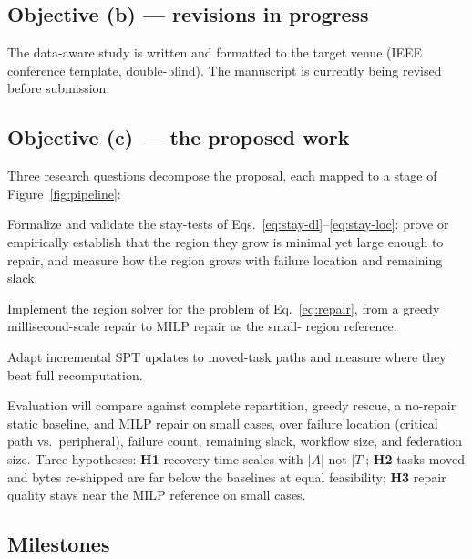 \documentclass[11pt]{article}
\begin{document}
\subsection{Objective (b) --- revisions in progress}

The data-aware study is written and formatted to the target
venue (IEEE conference template, double-blind). The manuscript
is currently being revised before submission.

\subsection{Objective (c) --- the proposed work}

Three research questions decompose the proposal, each mapped to
a stage of Figure~\ref{fig:pipeline}:

\begin{description}[leftmargin=*,style=nextline]
\item[RQ1 --- Boundary (Stage 3).] Formalize and validate the
stay-tests of Eqs.~\eqref{eq:stay-dl}--\eqref{eq:stay-loc}:
prove or empirically establish that the region they grow is
minimal yet large enough to repair, and measure how the region
grows with failure location and remaining slack.
\item[RQ2 --- Repair (Stages 4--5).] Implement the region
solver for the problem of Eq.~\eqref{eq:repair}, from a
greedy millisecond-scale repair to MILP repair as the small-
region reference.
\item[RQ3 --- Paths (Stage 6).] Adapt incremental SPT updates
to moved-task paths and measure where they beat full
recomputation.
\end{description}

Evaluation will compare against complete repartition, greedy
rescue, a no-repair static baseline, and MILP repair on small
cases, over failure location (critical path vs.\ peripheral),
failure count, remaining slack, workflow size, and federation
size. Three hypotheses: \textbf{H1} recovery time scales with
$|A|$ not $|T|$; \textbf{H2} tasks moved and bytes re-shipped
are far below the baselines at equal feasibility;
\textbf{H3} repair quality stays near the MILP reference on
small cases.

\subsection{Milestones}
\end{document}

